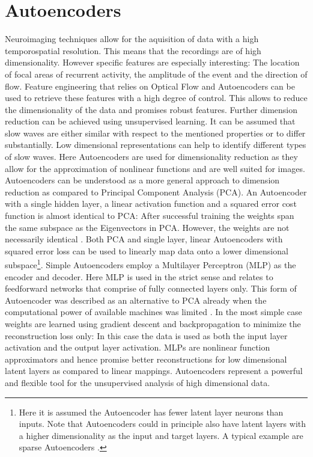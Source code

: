 \section{Autoencoders}
Neuroimaging techniques allow for the aquisition of data with a high temporospatial resolution. This means that the recordings are of high dimensionality. However specific features are especially interesting: The location of focal areas of recurrent activity, the amplitude of the event and the direction of flow. Feature engineering that relies on Optical Flow and Autoencoders can be used to retrieve these features with a high degree of control. This allows to reduce the dimensionality of the data and promises robust features. Further dimension reduction can be achieved using unsupervised learning. It can be assumed that slow waves are either similar with respect to the mentioned properties or to differ substantially. Low dimensional representations can help to identify different types of slow waves. Here Autoencoders are used for dimensionality reduction as they allow for the approximation of nonlinear functions and are well suited for images.\\
Autoencoders can be understood as a more general approach to dimension reduction as compared to Principal Component Analysis (PCA). An Autoencoder with a single hidden layer, a linear activation function and a squared error cost function is almost identical to PCA: After successful training the weights span the same subspace as the Eigenvectors in PCA. However, the weights are not necessarily identical \parencite{plaut2018principal}. Both PCA and single layer, linear Autoencoders with squared error loss can be used to linearly map data onto a lower dimensional subspace\footnote{Here it is assumed the Autoencoder has fewer latent layer neurons than inputs. Note that Autoencoders could in principle also have latent layers with a higher dimensionality as the input and target layers. A typical example are sparse Autoencoders \parencite{paperswithcode2021sparse}.}.
Simple Autoencoders employ a Multilayer Perceptron (MLP) as the encoder and decoder. Here MLP is used in the strict sense and relates to feedforward networks that comprise of fully connected layers only. This form of Autoencoder was described as an alternative to PCA already when the computational power of available machines was limited \parencite{kramer1991nonlinear}. In the most simple case weights are learned using gradient descent and backpropagation to minimize the reconstruction loss only: In this case the data is used as both the input layer activation and the output layer activation. MLPs are nonlinear function approximators and hence promise better reconstructions for low dimensional latent layers as compared to linear mappings. Autoencoders represent a powerful and flexible tool for the unsupervised analysis of high dimensional data.\\
